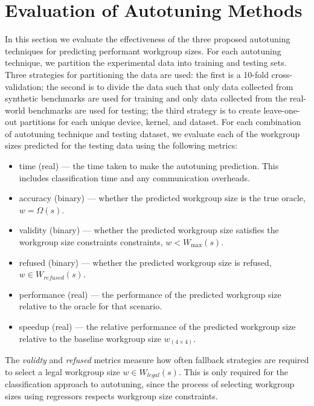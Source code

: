 \documentclass{acaces}
\begin{document}


\section{Evaluation of Autotuning Methods}\label{sec:evaluation}

In this section we evaluate the effectiveness of the three proposed
autotuning techniques for predicting performant workgroup sizes. For
each autotuning technique, we partition the experimental data into
training and testing sets. Three strategies for partitioning the data
are used: the first is a 10-fold cross-validation; the second is to
divide the data such that only data collected from synthetic
benchmarks are used for training and only data collected from the
real-world benchmarks are used for testing; the third strategy is to
create leave-one-out partitions for each unique device, kernel, and
dataset. For each combination of autotuning technique and testing
dataset, we evaluate each of the workgroup sizes predicted for the
testing data using the following metrics:
%
\begin{itemize}
\item time (real) --- the time taken to make the autotuning
  prediction. This includes classification time and any communication
  overheads.
\item accuracy (binary) --- whether the predicted workgroup size is
  the true oracle, $w = \Omega(s)$.
\item validity (binary) --- whether the predicted workgroup size
  satisfies the workgroup size constraints constraints,
  $w < W_{\max}(s)$.
\item refused (binary) --- whether the predicted workgroup size is
  refused, $w \in W_{refused}(s)$.
\item performance (real) --- the performance of the predicted
  workgroup size relative to the oracle for that scenario.
\item speedup (real) --- the relative performance of the predicted
  workgroup size relative to the baseline workgroup size
  $w_{(4 \times 4)}$.
\end{itemize}
%
The \emph{validty} and \emph{refused} metrics measure how often
fallback strategies are required to select a legal workgroup size
$w \in W_{legal}(s)$. This is only required for the classification
approach to autotuning, since the process of selecting workgroup sizes
using regressors respects workgroup size constraints.
\end{document}
